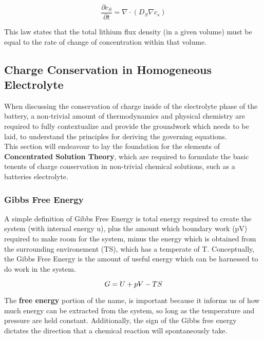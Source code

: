 \documentclass[lettersize,journal]{IEEEtran}
\newcommand{\volume}{{\ooalign{\hfil$V$\hfil\cr\kern0.08em--\hfil\cr}}}
\begin{document}
\begin{equation}
    \frac{\partial c_{S}}{\partial t} = \nabla \cdot \left( D_{S} \nabla c_{s} \right)
\end{equation}

This law states that the total lithium flux density (in a given volume) must be equal to the rate of change of concentration within that volume.


\subsection{Charge Conservation in Homogeneous Electrolyte}

When discussing the conservation of charge inside of the electrolyte phase of the battery, a non-trivial amount of thermodynamics and physical chemistry are required to fully contextualize and provide the groundwork which needs to be laid, to understand the principles for deriving the governing equations. \\

This section will endeavour to lay the foundation for the elements of \textbf{Concentrated Solution Theory}, which are required to formulate the basic tenents of charge conservation in non-trivial chemical solutions, such as a batteries electrolyte.

\subsubsection{Gibbs Free Energy}
A simple definition of Gibbs Free Energy is total energy required to create the system (with internal energy u), plus the amount which boundary work (pV) required to make room for the system, minus the energy which is obtained from the surrounding environement (TS), which has a temperate of T. Conceptually, the Gibbs Free Energy is the amount of useful energy which can be harnessed to do work in the system.

\begin{equation} \label{gibbs_free_energy}
  G = U + p{\volume} - TS
\end{equation}

 The \textbf{free energy} portion of the name, is important because it informs us of how much energy can be extracted from the system, so long as the temperature and pressure are held constant. Additionally, the sign of the Gibbs free energy dictates the direction that a chemical reaction will spontaneously take. \\
\end{document}
